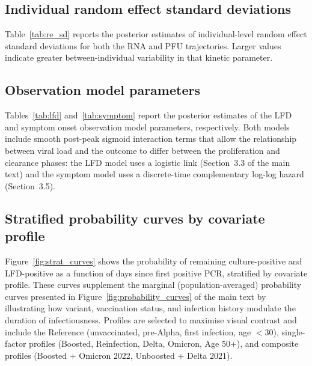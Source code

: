 \begin{appendix}
    

    \subsection{Individual random effect standard deviations}

    Table~\ref{tab:re_sd} reports the posterior estimates of individual-level random effect standard deviations for both the RNA and PFU trajectories. Larger values indicate greater between-individual variability in that kinetic parameter.

    

    \subsection{Observation model parameters}

    Tables~\ref{tab:lfd} and~\ref{tab:symptom} report the posterior estimates of the LFD and symptom onset observation model parameters, respectively. Both models include smooth post-peak sigmoid interaction terms that allow the relationship between viral load and the outcome to differ between the proliferation and clearance phases: the LFD model uses a logistic link (Section~3.3 of the main text) and the symptom model uses a discrete-time complementary log-log hazard (Section~3.5).

    
    

    \subsection{Stratified probability curves by covariate profile}
    \label{sec:supp_strat}

    Figure~\ref{fig:strat_curves} shows the probability of remaining culture-positive and LFD-positive as a function of days since first positive PCR, stratified by covariate profile. These curves supplement the marginal (population-averaged) probability curves presented in Figure~\ref{fig:probability_curves} of the main text by illustrating how variant, vaccination status, and infection history modulate the duration of infectiousness. Profiles are selected to maximise visual contrast and include the Reference (unvaccinated, pre-Alpha, first infection, age $<$30), single-factor profiles (Boosted, Reinfection, Delta, Omicron, Age 50+), and composite profiles (Boosted + Omicron 2022, Unboosted + Delta 2021).


\end{appendix}
